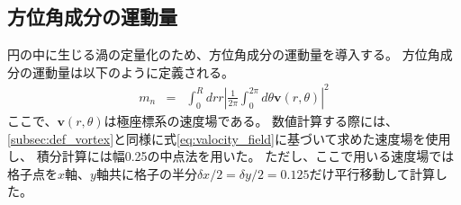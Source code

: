 \documentclass[/Users/ikedahajime/GitHub/reserch/master_report/thesis]{subfiles}
\begin{document}
\subsection{方位角成分の運動量}
円の中に生じる渦の定量化のため、方位角成分の運動量を導入する。
方位角成分の運動量は以下のように定義される。
\begin{eqnarray}
    m_n &=& \int_0^R dr r\left|\frac{1}{2\pi}\int_0^{2\pi}d\theta \bm{v}(r,\theta)\right|^2
\end{eqnarray}
ここで、$\bm{v}(r,\theta)$は極座標系の速度場である。
数値計算する際には、\ref{subsec:def_vortex}と同様に式\ref{eq:valocity_field}に基づいて求めた速度場を使用し、
積分計算には幅0.25の中点法を用いた。
ただし、ここで用いる速度場では格子点を$x$軸、$y$軸共に格子の半分$\delta x/2=\delta y/2=0.125$だけ平行移動して計算した。



\ifSubfilesClassLoaded{
    \printbibliography[title=参考文献]
    }{}
\end{document}

